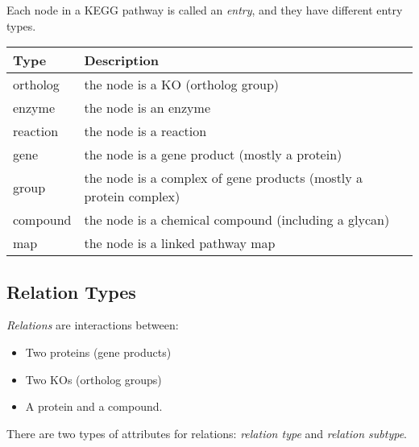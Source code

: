 \documentclass[10pt]{article}
\begin{document}
Each node in a KEGG pathway is called an \emph{entry}, and they have different entry types.  
\begin{center}
\begin{tabular}{l|l}
\textbf{Type} & \textbf{Description} \\ \hline
ortholog        & the node is a KO (ortholog group)\\
enzyme          & the node is an enzyme\\
reaction        & the node is a reaction\\
gene            & the node is a gene product (mostly a protein)\\
group           & the node is a complex of gene products (mostly a protein complex) \\
compound        & the node is a chemical compound (including a glycan)\\
map             & the node is a linked pathway map 
\end{tabular}
\end{center}

\subsection{Relation Types}

\emph{Relations} are interactions between:
\begin{itemize}
\item Two proteins (gene products)
\item Two KOs (ortholog groups)
\item A protein and a compound.
\end{itemize}
\noindent There are two types of attributes for relations: \emph{relation type} and \emph{relation subtype}.
\end{document}
